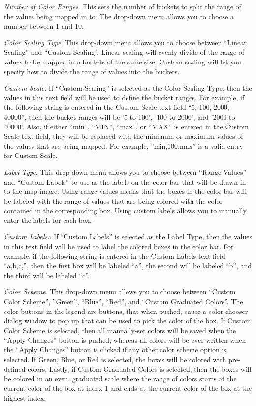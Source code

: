 \emph{Number of Color Ranges}. 
This sets the number of buckets to split the range of the values 
being mapped in to. The drop-down menu allows you to choose a 
number between 1 and 10.

\emph{Color Scaling Type}. 
This drop-down menu allows you to choose between ``Linear Scaling''
and ``Custom Scaling''. Linear scaling will evenly divide of the 
range of values to be mapped into buckets of the same size.  
Custom scaling will let you specify how to divide the range of values 
into the buckets. 

\emph{Custom Scale}. 
If ``Custom Scaling'' is selected as the Color Scaling Type, then 
the values in this text field will be used to define the bucket 
ranges. For example, if the following string is entered in 
the Custom Scale text field ``5, 100, 2000, 40000'', then the bucket 
ranges will be '5 to 100', '100 to 2000', and '2000 to 40000'.  
Also, if either ``min'', ``MIN'', ``max'', or ``MAX'' is entered in the 
Custom Scale text field, they will be replaced with the minimum 
or maximum values of the values that are being mapped. For example, 
''min,100,max'' is a valid entry for Custom Scale.

\emph{Label Type}. This drop-down menu allows 
you to choose between ``Range Values'' and 
``Custom Labels'' to use as the labels on the color bar that will 
be drawn in to the map image. Using range values means that the 
boxes in the color bar will be labeled with the range of values that 
are being colored with the color contained in the corresponding box. 
Using custom labels allows you to manually enter the labels 
for each box.

\emph{Custom Labels:}. If ``Custom Labels'' is 
selected as the Label Type, then the values 
in this text field will be used to label the colored boxes in the 
color bar. For example, if the following string is entered in 
the Custom Labels text field ``a,b,c,'', then the first box will 
be labeled ``a'', the second will be labeled ``b'', and the third 
will be labeled ``c''.

\emph{Color Scheme}. This drop-down menu allows you to choose between ``Custom Color Scheme'', 
''Green'', ``Blue'', ``Red'', and ``Custom Graduated Colors''. The color 
buttons in the legend are buttons, that when pushed, cause a color 
chooser dialog window to pop up that can be used to pick the color of 
the box. If Custom Color Scheme is selected, then all manually-set colors 
will be saved when the ``Apply Changes'' button is pushed, whereas all colors 
will be over-written when the ``Apply Changes'' button is clicked if any other 
color scheme option is selected. If Green, Blue, or Red is selected, the 
boxes will be colored with pre-defined colors. Lastly, if Custom Graduated 
Colors is selected, then the boxes will be colored in an even, graduated 
scale where the range of colors starts at the current color of the box at 
index 1 and ends at the current color of the box at the highest index.

